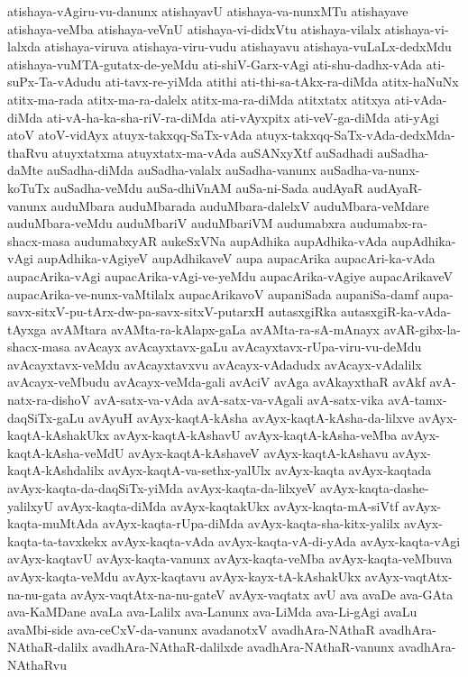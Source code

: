 {atishaya-vAgiru-vu-danunx
atishayavU
atishaya-va-nunxMTu
atishayave
atishaya-veMba
atishaya-veVnU
atishaya-vi-didxVtu
atishaya-vilalx
atishaya-vi-lalxda
atishaya-viruva
atishaya-viru-vudu
atishayavu
atishaya-vuLaLx-dedxMdu
atishaya-vuMTA-gutatx-de-yeMdu
ati-shiV-Garx-vAgi
ati-shu-dadhx-vAda
ati-suPx-Ta-vAdudu
ati-tavx-re-yiMda
atithi
ati-thi-sa-tAkx-ra-diMda
atitx-haNuNx
atitx-ma-rada
atitx-ma-ra-dalelx
atitx-ma-ra-diMda
atitxtatx
atitxya
ati-vAda-diMda
ati-vA-ha-ka-sha-riV-ra-diMda
ati-vAyxpitx
ati-veV-ga-diMda
ati-yAgi
atoV
atoV-vidAyx
atuyx-takxqq-SaTx-vAda
atuyx-takxqq-SaTx-vAda-dedxMda-thaRvu
atuyxtatxma
atuyxtatx-ma-vAda
auSANxyXtf
auSadhadi
auSadha-daMte
auSadha-diMda
auSadha-valalx
auSadha-vanunx
auSadha-va-nunx-koTuTx
auSadha-veMdu
auSa-dhiVnAM
auSa-ni-Sada
audAyaR
audAyaR-vanunx
auduMbara
auduMbarada
auduMbara-dalelxV
auduMbara-veMdare
auduMbara-veMdu
auduMbariV
auduMbariVM
audumabxra
audumabx-ra-shacx-masa
audumabxyAR
aukeSxVNa
aupAdhika
aupAdhika-vAda
aupAdhika-vAgi
aupAdhika-vAgiyeV
aupAdhikaveV
aupa
aupacArika
aupacAri-ka-vAda
aupacArika-vAgi
aupacArika-vAgi-ve-yeMdu
aupacArika-vAgiye
aupacArikaveV
aupacArika-ve-nunx-vaMtilalx
aupacArikavoV
aupaniSada
aupaniSa-damf
aupa-savx-sitxV-pu-tArx-dw-pa-savx-sitxV-putarxH
autasxgiRka
autasxgiR-ka-vAda-tAyxga
avAMtara
avAMta-ra-kAlapx-gaLa
avAMta-ra-sA-mAnayx
avAR-gibx-la-shacx-masa
avAcayx
avAcayxtavx-gaLu
avAcayxtavx-rUpa-viru-vu-deMdu
avAcayxtavx-veMdu
avAcayxtavxvu
avAcayx-vAdadudx
avAcayx-vAdalilx
avAcayx-veMbudu
avAcayx-veMda-gali
avAciV
avAga
avAkayxthaR
avAkf
avA-natx-ra-dishoV
avA-satx-va-vAda
avA-satx-va-vAgali
avA-satx-vika
avA-tamx-daqSiTx-gaLu
avAyuH
avAyx-kaqtA-kAsha
avAyx-kaqtA-kAsha-da-lilxve
avAyx-kaqtA-kAshakUkx
avAyx-kaqtA-kAshavU
avAyx-kaqtA-kAsha-veMba
avAyx-kaqtA-kAsha-veMdU
avAyx-kaqtA-kAshaveV
avAyx-kaqtA-kAshavu
avAyx-kaqtA-kAshdalilx
avAyx-kaqtA-va-sethx-yalUlx
avAyx-kaqta
avAyx-kaqtada
avAyx-kaqta-da-daqSiTx-yiMda
avAyx-kaqta-da-lilxyeV
avAyx-kaqta-dashe-yalilxyU
avAyx-kaqta-diMda
avAyx-kaqtakUkx
avAyx-kaqta-mA-siVtf
avAyx-kaqta-muMtAda
avAyx-kaqta-rUpa-diMda
avAyx-kaqta-sha-kitx-yalilx
avAyx-kaqta-ta-tavxkekx
avAyx-kaqta-vAda
avAyx-kaqta-vA-di-yAda
avAyx-kaqta-vAgi
avAyx-kaqtavU
avAyx-kaqta-vanunx
avAyx-kaqta-veMba
avAyx-kaqta-veMbuva
avAyx-kaqta-veMdu
avAyx-kaqtavu
avAyx-kayx-tA-kAshakUkx
avAyx-vaqtAtx-na-nu-gata
avAyx-vaqtAtx-na-nu-gateV
avAyx-vaqtatx
avU
ava
avaDe
ava-GAta
ava-KaMDane
avaLa
ava-Lalilx
ava-Lanunx
ava-LiMda
ava-Li-gAgi
avaLu
avaMbi-side
ava-ceCxV-da-vanunx
avadanotxV
avadhAra-NAthaR
avadhAra-NAthaR-dalilx
avadhAra-NAthaR-dalilxde
avadhAra-NAthaR-vanunx
avadhAra-NAthaRvu
}
